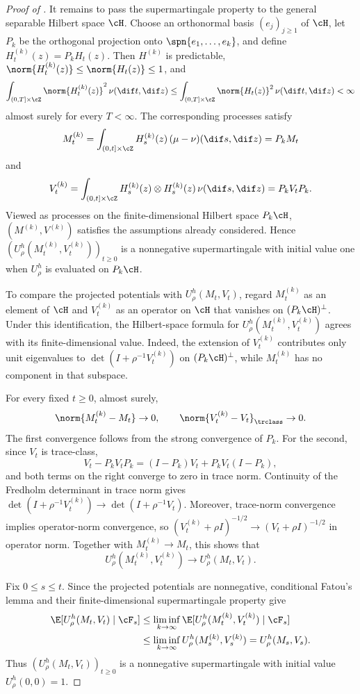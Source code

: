 \documentclass[11pt]{article}
\let\cref\zcref
\begin{document}
\begin{proof}[Proof of \cref{prop:continuous-bounded-jumps}]
It remains to pass the supermartingale property to the general separable Hilbert space $\cH$. Choose an orthonormal basis $(e_j)_{j\geq1}$ of $\cH$, let $P_k$ be the orthogonal projection onto $\spn\{e_1,\dots,e_k\}$, and define $H_t^{(k)}(z)=P_kH_t(z)$. Then $H^{(k)}$ is predictable, $\norm{H_t^{(k)}(z)}\leq\norm{H_t(z)}\leq1$, and
\[
  \int_{(0,T]\times\cZ}\norm{H_t^{(k)}(z)}^2\,\nu(\dif t,\dif z)\leq\int_{(0,T]\times\cZ}\norm{H_t(z)}^2\,\nu(\dif t,\dif z)<\infty
\]
almost surely for every $T<\infty$. The corresponding processes satisfy
\[
  M_t^{(k)}=\int_{(0,t]\times\cZ}H_s^{(k)}(z)\,(\mu-\nu)(\dif s,\dif z)=P_kM_t
\]
and
\[
  V_t^{(k)}=\int_{(0,t]\times\cZ}H_s^{(k)}(z)\otimes H_s^{(k)}(z)\,\nu(\dif s,\dif z)=P_kV_tP_k.
\]
Viewed as processes on the finite-dimensional Hilbert space $P_k\cH$, $(M^{(k)},V^{(k)})$ satisfies the assumptions already considered. Hence $(U_\rho^h(M_t^{(k)},V_t^{(k)}))_{t\geq0}$ is a nonnegative supermartingale with initial value one when $U_\rho^h$ is evaluated on $P_k\cH$.

To compare the projected potentials with $U_\rho^h(M_t,V_t)$, regard $M_t^{(k)}$ as an element of $\cH$ and $V_t^{(k)}$ as an operator on $\cH$ that vanishes on $(P_k\cH)^\perp$. Under this identification, the Hilbert-space formula for $U_\rho^h(M_t^{(k)},V_t^{(k)})$ agrees with its finite-dimensional value. Indeed, the extension of $V_t^{(k)}$ contributes only unit eigenvalues to $\det(I+\rho^{-1}V_t^{(k)})$ on $(P_k\cH)^\perp$, while $M_t^{(k)}$ has no component in that subspace.

For every fixed $t\geq0$, almost surely,
\[
  \norm{M_t^{(k)}-M_t}\to0,\qquad \norm{V_t^{(k)}-V_t}_{\trclass}\to0.
\]
The first convergence follows from the strong convergence of $P_k$. For the second, since $V_t$ is trace-class,
\[
  V_t-P_kV_tP_k=(I-P_k)V_t+P_kV_t(I-P_k),
\]
and both terms on the right converge to zero in trace norm. Continuity of the Fredholm determinant in trace norm gives
$\det(I+\rho^{-1}V_t^{(k)})\to\det(I+\rho^{-1}V_t)$. Moreover, trace-norm convergence implies operator-norm convergence, so
$(V_t^{(k)}+\rho I)^{-1/2}\to(V_t+\rho I)^{-1/2}$ in operator norm. Together with $M_t^{(k)}\to M_t$, this shows that
\[
  U_\rho^h(M_t^{(k)},V_t^{(k)})\to U_\rho^h(M_t,V_t).
\]

Fix $0\leq s\leq t$. Since the projected potentials are nonnegative, conditional Fatou's lemma and their finite-dimensional supermartingale property give
\begin{align*}
  \E[U_\rho^h(M_t,V_t)\mid\cF_s]&\leq\liminf_{k\to\infty}\E[U_\rho^h(M_t^{(k)},V_t^{(k)})\mid\cF_s] \\
  &\leq\liminf_{k\to\infty}U_\rho^h(M_s^{(k)},V_s^{(k)})=U_\rho^h(M_s,V_s).
\end{align*}
Thus $(U_\rho^h(M_t,V_t))_{t\geq0}$ is a nonnegative supermartingale with initial value $U_\rho^h(0,0)=1$.


\end{proof}
\end{document}
